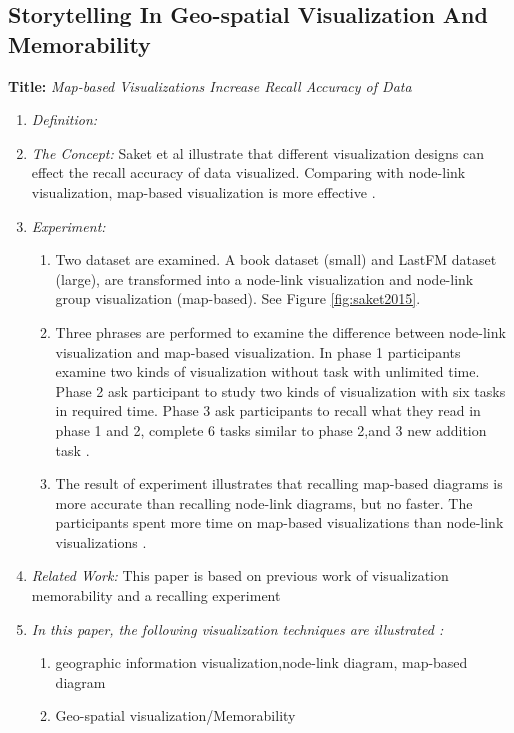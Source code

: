 \documentclass{egpubl}
\begin{document}
\subsection{Storytelling In Geo-spatial Visualization And Memorability}
\textbf{Title:} \textit{Map-based Visualizations Increase Recall Accuracy of Data}
\begin{enumerate}
\item \textit{Definition:}  
\item \textit{The Concept:} Saket et al illustrate that different visualization designs can effect the recall accuracy of data visualized. Comparing with node-link visualization, map-based visualization is more effective \cite{saket2015}.
\item  \textit{Experiment:} 
\begin{enumerate}
\item Two dataset are examined. A book dataset (small) and LastFM dataset (large), are transformed into a node-link visualization and node-link group visualization (map-based). See Figure \ref{fig:saket2015}.
\item Three phrases are performed to examine the difference between node-link visualization and map-based visualization. In phase 1 participants examine two kinds of visualization without task with unlimited time. Phase 2 ask participant to study two kinds of visualization with six tasks in required time. Phase 3 ask participants to recall what they read in phase 1 and 2, complete 6 tasks similar to phase 2,and 3 new addition task \cite{saket2015}.
\item The result of experiment illustrates that recalling map-based diagrams is more accurate than recalling node-link diagrams, but no faster.
The participants spent more time on map-based visualizations than node-link visualizations \cite{saket2015}.  
\end{enumerate}
\item \textit{Related Work:} This paper is based on previous work of visualization memorability \cite{bateman} and a recalling experiment \cite{isola2011}
\item \textit{In this paper, the following visualization techniques are illustrated :} 
\begin{enumerate}
\item geographic information visualization,node-link diagram, map-based diagram
\item Geo-spatial visualization/Memorability
\end{enumerate}
\end{enumerate}
\end{document}
